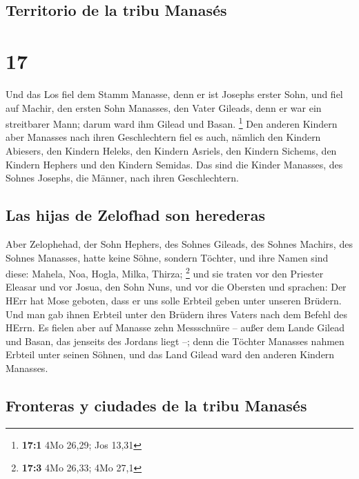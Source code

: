 \hypertarget{territorio-de-la-tribu-manasuxe9s}{%
\subsection{Territorio de la tribu
Manasés}\label{territorio-de-la-tribu-manasuxe9s}}

\hypertarget{section-16}{%
\section{17}\label{section-16}}

 Und das Los fiel dem Stamm Manasse, denn er ist Josephs
erster Sohn, und fiel auf Machir, den ersten Sohn Manasses, den Vater
Gileads, denn er war ein streitbarer Mann; darum ward ihm Gilead und
Basan. \footnote{\textbf{17:1} 4Mo 26,29; Jos 13,31}  Den
anderen Kindern aber Manasses nach ihren Geschlechtern fiel es auch,
nämlich den Kindern Abiesers, den Kindern Heleks, den Kindern Asriels,
den Kindern Sichems, den Kindern Hephers und den Kindern Semidas. Das
sind die Kinder Manasses, des Sohnes Josephs, die Männer, nach ihren
Geschlechtern.

\hypertarget{las-hijas-de-zelofhad-son-herederas}{%
\subsection{Las hijas de Zelofhad son
herederas}\label{las-hijas-de-zelofhad-son-herederas}}

 Aber Zelophehad, der Sohn Hephers, des Sohnes Gileads,
des Sohnes Machirs, des Sohnes Manasses, hatte keine Söhne, sondern
Töchter, und ihre Namen sind diese: Mahela, Noa, Hogla, Milka, Thirza;
\footnote{\textbf{17:3} 4Mo 26,33; 4Mo 27,1}  und sie
traten vor den Priester Eleasar und vor Josua, den Sohn Nuns, und vor
die Obersten und sprachen: Der HErr hat Mose geboten, dass er uns solle
Erbteil geben unter unseren Brüdern. Und man gab ihnen Erbteil unter den
Brüdern ihres Vaters nach dem Befehl des HErrn.  Es fielen
aber auf Manasse zehn Messschnüre -- außer dem Lande Gilead und Basan,
das jenseits des Jordans liegt --;  denn die Töchter
Manasses nahmen Erbteil unter seinen Söhnen, und das Land Gilead ward
den anderen Kindern Manasses.

\hypertarget{fronteras-y-ciudades-de-la-tribu-manasuxe9s}{%
\subsection{Fronteras y ciudades de la tribu
Manasés}\label{fronteras-y-ciudades-de-la-tribu-manasuxe9s}}


